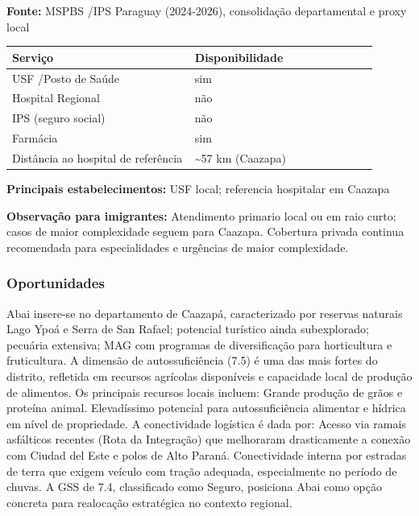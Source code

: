 \textbf{Fonte:} MSPBS /\allowbreak  IPS Paraguay (2024-2026), consolidação
departamental e proxy local

{\def\LTcaptype{none} %
\begin{longtable}{@{}>{\raggedright\arraybackslash}p{0.45\linewidth} >{\raggedright\arraybackslash}p{0.45\linewidth}@{}}
\toprule\noalign{}
Serviço & Disponibilidade \\
\midrule\noalign{}
\endhead
\bottomrule\noalign{}
\endlastfoot
USF /\allowbreak  Posto de Saúde & sim \\
Hospital Regional & não \\
IPS (seguro social) & não \\
Farmácia & sim \\
Distância ao hospital de referência & \textasciitilde57 km (Caazapa) \\
\end{longtable}
}

\textbf{Principais estabelecimentos:} USF local; referencia hospitalar
em Caazapa

\textbf{Observação para imigrantes:} Atendimento primario local ou em
raio curto; casos de maior complexidade seguem para Caazapa. Cobertura
privada continua recomendada para especialidades e urgências de maior
complexidade.
\newpage

\subsubsection*{Oportunidades}\label{oport-abai-0602}
Abai insere-se no departamento de Caazapá, caracterizado por reservas naturais Lago Ypoá e Serra de San Rafael; potencial turístico ainda subexplorado; pecuária extensiva; MAG com programas de diversificação para horticultura e fruticultura. A dimensão de autossuficiência (7.5) é uma das mais fortes do distrito, refletida em recursos agrícolas disponíveis e capacidade local de produção de alimentos. Os principais recursos locais incluem: Grande produção de grãos e proteína animal. Elevadíssimo potencial para autossuficiência alimentar e hídrica em nível de propriedade. A conectividade logística é dada por: Acesso via ramais asfálticos recentes (Rota da Integração) que melhoraram drasticamente a conexão com Ciudad del Este e polos de Alto Paraná. Conectividade interna por estradas de terra que exigem veículo com tração adequada, especialmente no período de chuvas. A GSS de 7.4, classificado como Seguro, posiciona Abai como opção concreta para realocação estratégica no contexto regional.


